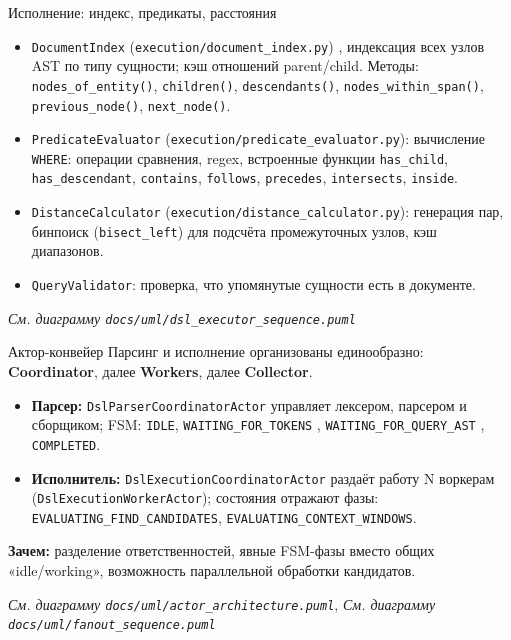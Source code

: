 \documentclass[aspectratio=169,11pt]{beamer}
\newcommand{\uml}[1]{\textit{См. диаграмму \texttt{docs/uml/#1}}}
\begin{document}
\begin{frame}{Исполнение: индекс, предикаты, расстояния}
  \begin{itemize}
    \item \texttt{DocumentIndex} (\texttt{execution/document\_index.py}) ,
          индексация всех узлов AST по типу сущности; кэш отношений
          parent/child. Методы: \texttt{nodes\_of\_entity()},
          \texttt{children()}, \texttt{descendants()},
          \texttt{nodes\_within\_span()}, \texttt{previous\_node()},
          \texttt{next\_node()}.
    \item \texttt{PredicateEvaluator}
          (\texttt{execution/predicate\_evaluator.py}): вычисление
          \texttt{WHERE}: операции сравнения, regex, встроенные функции
          \texttt{has\_child}, \texttt{has\_descendant}, \texttt{contains},
          \texttt{follows}, \texttt{precedes}, \texttt{intersects},
          \texttt{inside}.
    \item \texttt{DistanceCalculator}
          (\texttt{execution/distance\_calculator.py}): генерация пар,
          бинпоиск (\texttt{bisect\_left}) для подсчёта промежуточных узлов,
          кэш диапазонов.
    \item \texttt{QueryValidator}: проверка, что упомянутые сущности есть в
          документе.
  \end{itemize}
  \uml{dsl\_executor\_sequence.puml}
\end{frame}

\begin{frame}{Актор-конвейер}
  Парсинг и исполнение организованы единообразно: \\
  \textbf{Coordinator}, далее \textbf{Workers}, далее
  \textbf{Collector}.
  \begin{itemize}
    \item \textbf{Парсер:} \texttt{DslParserCoordinatorActor} управляет
          лексером, парсером и сборщиком; FSM:
          \texttt{IDLE}, \texttt{WAITING\_FOR\_TOKENS}
          , \texttt{WAITING\_FOR\_QUERY\_AST}
          , \texttt{COMPLETED}.
    \item \textbf{Исполнитель:} \texttt{DslExecutionCoordinatorActor}
          раздаёт работу N воркерам (\texttt{DslExecutionWorkerActor});
          состояния отражают фазы:
          \texttt{EVALUATING\_FIND\_CANDIDATES},
          \texttt{EVALUATING\_CONTEXT\_WINDOWS}.
  \end{itemize}
  \textbf{Зачем:} разделение ответственностей, явные FSM-фазы вместо общих
  «idle/working», возможность параллельной обработки кандидатов.
  \par\vspace{0.3em}
  \uml{actor\_architecture.puml}, \uml{fanout\_sequence.puml}
\end{frame}
\end{document}
